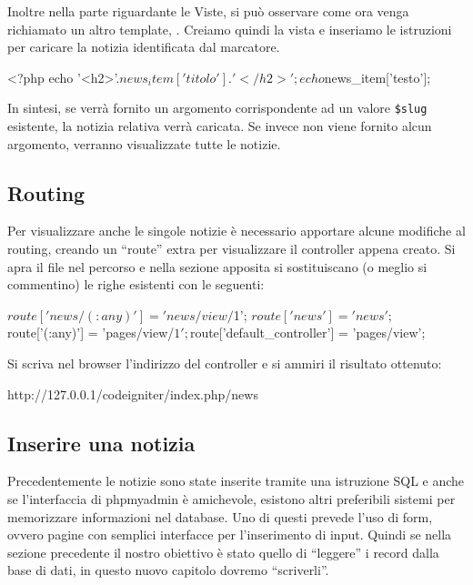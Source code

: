 Inoltre nella parte riguardante le Viste, si può osservare come ora venga richiamato un altro template, . Creiamo quindi la vista  e inseriamo le istruzioni per caricare la notizia identificata dal marcatore.

\begin{code}
<?php
echo '<h2>'.$news_item['titolo'].'</h2>';
echo $news_item['testo'];
\end{code}

In sintesi, se verrà fornito un argomento corrispondente ad un valore \verb|$slug| esistente, la notizia relativa verrà caricata. Se invece non viene fornito alcun argomento, verranno visualizzate tutte le notizie.

\subsection{Routing}
Per visualizzare anche le singole notizie è necessario apportare alcune modifiche al routing, creando un ``route'' extra per visualizzare il controller appena creato. Si apra il file  nel percorso  e nella sezione apposita si sostituiscano (o meglio si commentino) le righe esistenti con le seguenti:

\begin{code}
$route['news/(:any)'] = 'news/view/$1';
$route['news'] = 'news';
$route['(:any)'] = 'pages/view/$1';
$route['default_controller'] = 'pages/view';
\end{code}

Si scriva nel browser l'indirizzo del controller e si ammiri il risultato ottenuto:

\begin{code}
http://127.0.0.1/codeigniter/index.php/news
\end{code}

\subsection{Inserire una notizia}
Precedentemente le notizie sono state inserite tramite una istruzione SQL e anche se l'interfaccia di phpmyadmin è amichevole, esistono altri preferibili sistemi per memorizzare informazioni nel database. Uno di questi prevede l'uso di form, ovvero pagine con semplici interfacce per l'inserimento di input.
Quindi se nella sezione precedente il nostro obiettivo è stato quello di ``leggere'' i record dalla base di dati, in questo nuovo capitolo dovremo ``scriverli''.

